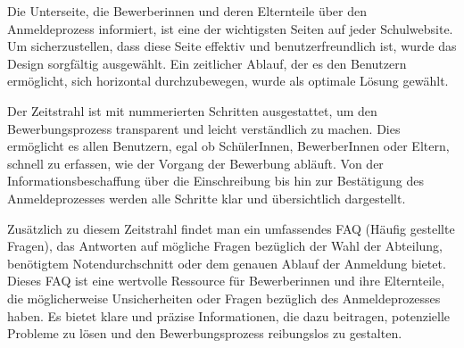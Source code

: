 Die Unterseite, die Bewerberinnen und deren Elternteile über den Anmeldeprozess informiert, ist eine der wichtigsten Seiten auf 
jeder Schulwebsite. Um sicherzustellen, dass diese Seite effektiv und benutzerfreundlich ist, wurde das Design sorgfältig ausgewählt. 
Ein zeitlicher Ablauf, der es den Benutzern ermöglicht, sich horizontal durchzubewegen, wurde als optimale Lösung gewählt.

Der Zeitstrahl ist mit nummerierten Schritten ausgestattet, um den Bewerbungsprozess transparent und leicht verständlich zu machen. 
Dies ermöglicht es allen Benutzern, egal ob SchülerInnen, BewerberInnen oder Eltern, schnell zu erfassen, wie der Vorgang der 
Bewerbung abläuft. Von der Informationsbeschaffung über die Einschreibung bis hin zur Bestätigung des Anmeldeprozesses werden alle Schritte 
klar und übersichtlich dargestellt.

Zusätzlich zu diesem Zeitstrahl findet man ein umfassendes FAQ (Häufig gestellte Fragen), das Antworten auf mögliche Fragen bezüglich der 
Wahl der Abteilung, benötigtem Notendurchschnitt oder dem genauen Ablauf der Anmeldung bietet. Dieses FAQ ist eine wertvolle Ressource 
für Bewerberinnen und ihre Elternteile, die möglicherweise Unsicherheiten oder Fragen bezüglich des Anmeldeprozesses haben. Es bietet 
klare und präzise Informationen, die dazu beitragen, potenzielle Probleme zu lösen und den Bewerbungsprozess reibungslos zu gestalten.

